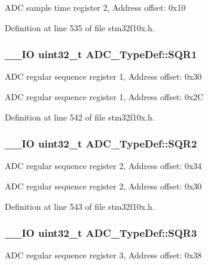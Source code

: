 A\-D\-C sample time register 2, Address offset\-: 0x10 

Definition at line 535 of file stm32f10x.\-h.

\hypertarget{struct_a_d_c___type_def_a0185aa54962ba987f192154fb7a2d673}{
\subsubsection[{S\-Q\-R1}]{\setlength{\rightskip}{0pt plus 5cm}\-\_\-\-\_\-\-I\-O {\bf uint32\-\_\-t} A\-D\-C\-\_\-\-Type\-Def\-::\-S\-Q\-R1}}\label{struct_a_d_c___type_def_a0185aa54962ba987f192154fb7a2d673}
A\-D\-C regular sequence register 1, Address offset\-: 0x30

A\-D\-C regular sequence register 1, Address offset\-: 0x2\-C 

Definition at line 542 of file stm32f10x.\-h.

\hypertarget{struct_a_d_c___type_def_a6b6e55e6c667042e5a46a76518b73d5a}{
\subsubsection[{S\-Q\-R2}]{\setlength{\rightskip}{0pt plus 5cm}\-\_\-\-\_\-\-I\-O {\bf uint32\-\_\-t} A\-D\-C\-\_\-\-Type\-Def\-::\-S\-Q\-R2}}\label{struct_a_d_c___type_def_a6b6e55e6c667042e5a46a76518b73d5a}
A\-D\-C regular sequence register 2, Address offset\-: 0x34

A\-D\-C regular sequence register 2, Address offset\-: 0x30 

Definition at line 543 of file stm32f10x.\-h.

\hypertarget{struct_a_d_c___type_def_a51dbdba74c4d3559157392109af68fc6}{
\subsubsection[{S\-Q\-R3}]{\setlength{\rightskip}{0pt plus 5cm}\-\_\-\-\_\-\-I\-O {\bf uint32\-\_\-t} A\-D\-C\-\_\-\-Type\-Def\-::\-S\-Q\-R3}}\label{struct_a_d_c___type_def_a51dbdba74c4d3559157392109af68fc6}
A\-D\-C regular sequence register 3, Address offset\-: 0x38

